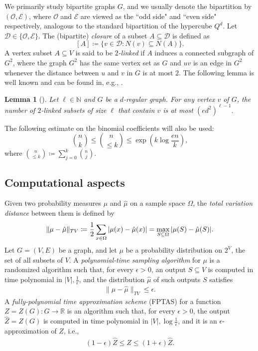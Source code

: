 \documentclass[reqno,a4paper,11pt]{amsart}
\newtheorem{lemma}[theorem]{Lemma}
\newcommand{\cD}{\mathcal{D}}
\newcommand{\cE}{\mathcal{E}}
\newcommand{\cO}{\mathcal{O}}
\newcommand{\Om}{\Omega}
\DeclarePairedDelimiter{\norm}{\lVert}{\rVert}
\begin{document}
We primarily study bipartite graphs $G$, and we usually denote the bipartition by $(\cO, \cE)$, where $\cO$ and $\cE$ are viewed as the ``odd side" and ``even side" respectively, analogous to the standard bipartition of the hypercube $Q^d$. Let $\cD \in \{\cO, \cE\}$. The (bipartite) \textit{closure} of a subset $A\subseteq \cD$ is defined as
$$[A]\coloneqq\{v\in \cD:N(v)\subseteq N(A)\}.$$ 
A vertex subset $A \subseteq V$ is said to be \textit{$2$-linked} if $A$ induces a connected subgraph of $G^2$, where the graph $G^2$ has the same vertex set as $G$ and $uv$ is an edge in $G^2$ whenever the distance between $u$ and $v$ in $G$ is at most $2$. The following lemma is well known and can be found in, e.g., \cite{GaKa2004}.
\begin{lemma}[\cite{GaKa2004}] \label{l:counting2linked}
  Let $\ell \in \mathbb{N}$ and $G$ be a $d$-regular graph. For any vertex $v$ of $G$, the number of $2$-linked subsets of size $\ell$ that contain $v$ is at most $(ed^2)^{\ell-1}$.
\end{lemma}
The following estimate on the binomial coefficients will also be used:
\begin{equation}\label{eqn:binom_estimate}
    \binom{n}{k}\leq \binom{n}{\leq k} \leq \exp\left(k\log\frac{en}{k}\right),
\end{equation}
where $\binom{n}{\leq k} \coloneqq \sum_{j=0}^k \binom{n}{j}$.

\subsection{Computational aspects}
Given two probability measures $\mu$ and $\hat{\mu}$ on a sample space $\Omega$, the \emph{total variation distance} between them is defined by
\begin{equation}\label{eq:totalvariationdist}
  \norm{\mu-\hat{\mu}}_{TV} \coloneqq \frac{1}{2} \sum_{x \in \Om} \left|\mu(x) - \hat{\mu}(x)\right| = \max_{S \subseteq \Om} |\mu(S) - \hat{\mu}(S)|.
\end{equation}
Let $G = (V, E)$ be a graph, and let $\mu$ be a probability distribution on $2^V$, the set of all subsets of $V$. A \emph{polynomial-time sampling algorithm} for $\mu$ is a randomized algorithm such that, for every $\epsilon>0$, an output $S \subseteq V$ is computed in time polynomial in $|V|, \frac{1}{\epsilon}$, and the distribution $\hat{\mu}$ of such outputs $S$ satisfies
\begin{align*}
    \lVert\mu - \hat{\mu}\rVert_{TV} \leq \epsilon.
\end{align*}
A \emph{fully-polynomial time approximation scheme} (FPTAS) for a function $Z=Z(G) : G \rightarrow \mathbb{R}$ is an algorithm such that, for every $\epsilon>0$, the output $\hat{Z} = \hat{Z}(G)$ is computed in time polynomial in $|V|, \log\frac{1}{\epsilon}$, and it is an $\epsilon$-approximation of $Z$, i.e.,
\begin{align*}
(1-\epsilon) \hat{Z} \leq Z \leq (1+\epsilon) \hat{Z}.
\end{align*}
\end{document}
